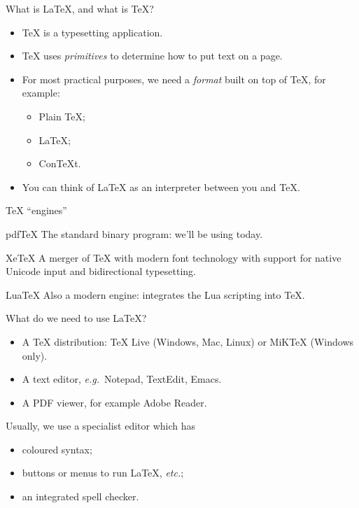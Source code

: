 
\begin{frame}{What is \LaTeX{}, and what is \TeX{}?}

  \begin{itemize}
	\item \TeX{} is a typesetting application.
	\item \TeX{} uses \emph{primitives} to determine how to put text on a page.
	\item For most practical purposes, we need a \emph{format} built on top of \TeX{}, for example:
	\begin{itemize}
	  \item Plain \TeX{};
	  \item \LaTeX{};
	  \item Con\TeX{}t.
	\end{itemize}
	\item You can think of \LaTeX{} as an interpreter between you and \TeX{}.
  \end{itemize}

\end{frame}

\begin{frame}{\TeX{} \enquote{engines}}

  \begin{block}{pdf\TeX{}}
	The standard binary program: we'll be using today.
  \end{block}

  \begin{block}{Xe\TeX{}}
	A merger of \TeX{} with modern font technology with support for native Unicode input and bidirectional typesetting.
  \end{block}

  \begin{block}{Lua\TeX{}}
	Also a modern engine: integrates the Lua scripting into \TeX{}.
  \end{block}

\end{frame}

\begin{frame}{What do we need to use \LaTeX{}?}

  \begin{itemize}
	\item A \TeX{} distribution: \TeX{} Live (Windows, Mac, Linux) or MiK\TeX{} (Windows only).
	\item A text editor, \emph{e.g.}~Notepad, TextEdit, Emacs.
	\item A PDF viewer, for example Adobe Reader.
  \end{itemize}

  \pause

  Usually, we use a specialist editor which has
  \begin{itemize}
	\item coloured syntax;
	\item buttons or menus to run \LaTeX{}, \emph{etc.};
	\item an integrated spell checker.
  \end{itemize}
\end{frame}

